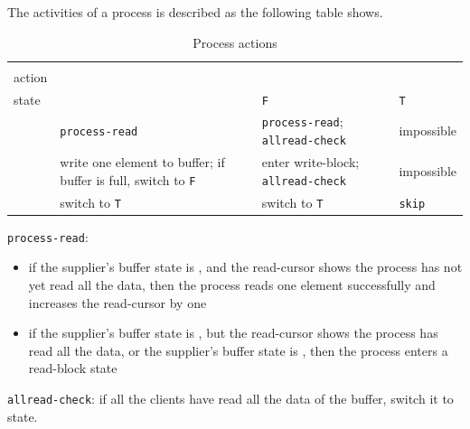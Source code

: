 The activities of a process is described as the following table shows.


 \begin{table}[H]\large
 	\renewcommand\arraystretch{1.5}
 	\centering
 	\begin{tabular}{|l|p{}|p{}|l|}  
 		\hline
 		 \diagbox{Xducer \\ action}{Buffer \\ state} & \filling & \draining \texttt{F} & \draining \texttt{T} \\ \hline
 		\pin  & \texttt{process-read}  & \texttt{process-read}; \texttt{allread-check}  & impossible \\
 		\hline
 		\pout &  write one element to buffer;
 		if buffer is full, switch to \draining \texttt{F}    &    enter write-block; \texttt{allread-check}   & impossible \\ 
 		\hline
 		\done &  switch to \draining \texttt{T}      & switch to \draining \texttt{T}   & \texttt{skip}  \\ 
 		\hline
 	\end{tabular}
 \caption{Process actions}
 \end{table}

\texttt{process-read}:

\begin{itemize}
	\item if the supplier's buffer state is \draining, and the read-cursor shows the process has not yet read all the data, then the process reads one element successfully and increases the read-cursor by one
	\item if the supplier's buffer state is \draining, but the read-cursor shows the process has read all the data, or the supplier's buffer state is \filling, then the process enters a read-block state
\end{itemize}


\texttt{allread-check}: if all the clients have read all the data of the buffer, switch it to \filling state.


